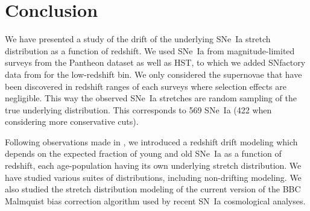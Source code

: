 \documentclass[]{aa} %
\begin{document}
\section{Conclusion}
\label{sec:ccl}

We have presented a study of the drift of the underlying SNe~Ia stretch
distribution as a function of redshift. We used SNe~Ia from magnitude-limited
surveys from the Pantheon dataset \citep[][SDSS, PS1 and SNLS]{scolnic2018a} as
well as HST, to which we added SNfactory data from \cite{rigault2018} for the
low-redshift bin. We only considered the supernovae that have been discovered
in redshift ranges of each surveys where selection effects are negligible. This
way the observed SNe~Ia stretches are random sampling of the true underlying
distribution. This corresponds to 569 SNe~Ia (422 when considering more
conservative cuts).

Following observations made in \cite{rigault2018}, we introduced a redshift
drift modeling which depends on the expected fraction of young and old SNe~Ia as
a function of redshift, each age-population having its own underlying stretch
distribution. We have studied various suites of distributions, including
non-drifting modeling. We also studied the stretch distribution modeling of the
current version of the BBC Malmquist bias correction algorithm used by recent
SN~Ia cosmological analyses. 
\end{document}
